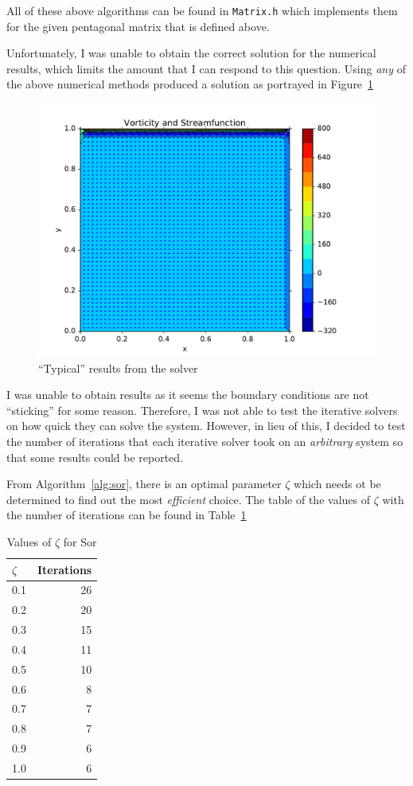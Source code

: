 \documentclass[addpoints]{exam}
\begin{document}
\begin{questions}
\begin{solution}
All of these above algorithms can be found in {\tt Matrix.h} which implements them for the given pentagonal matrix that is defined above.

Unfortunately, I was unable to obtain the correct solution for the numerical results, which limits the amount that I can respond to this question. Using {\em any} of the above numerical methods produced a solution as portrayed in Figure~\ref{fig:vorticity}

\begin{figure}[H]
\centering
\includegraphics[width = .8\textwidth]{plot_vorticity.pdf}
\caption{``Typical'' results from the solver}
\label{fig:vorticity}
\end{figure}

I was unable to obtain results as it seems the boundary conditions are not ``sticking'' for some reason. Therefore, I was not able to test the iterative solvers on how quick they can solve the system. However, in lieu of this, I decided to test the number of iterations that each iterative solver took on an {\em arbitrary} system so that some results could be reported.

From Algorithm~\ref{alg:sor}, there is an optimal parameter $\zeta$ which needs ot be determined to find out the most {\em efficient} choice. The table of the values of $\zeta$ with the number of iterations can be found in Table~\ref{table:sor}

\begin{table}[H]
\centering
\begin{tabular}{l r}
\hline\hline
$\zeta$ & Iterations\\
\hline
0.1 & 26\\
0.2 & 20\\
0.3 & 15\\
0.4 & 11\\
0.5 & 10\\
0.6 & 8\\
0.7 & 7\\
0.8 & 7\\
0.9 & 6\\
1.0 & 6\\
\hline\hline
\end{tabular}
\caption{Values of $\zeta$ for {\sc Sor}}
\label{table:sor}
\end{table}


\end{solution}
\end{questions}
\end{document}
